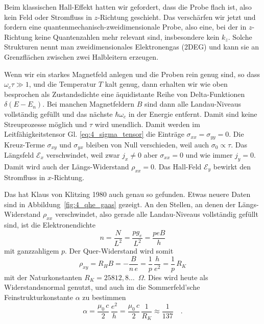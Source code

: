 Beim klassischen Hall-Effekt hatten wir gefordert, dass die  Probe flach  ist, also kein Feld oder Stromfluss in $z$-Richtung geschieht. Das verschärfen wir jetzt und fordern eine quantenmechanisch-zweidimensionale Probe, also eine, bei der in $z$-Richtung keine Quantenzahlen mehr relevant sind, insbesondere kein $k_z$. Solche Strukturen nennt man zweidimensionales Elektronengas (2DEG) und kann sie an Grenzflächen zwischen zwei Halbleitern erzeugen.

Wenn wir ein starkes Magnetfeld anlegen und die Proben rein genug sind, so dass $\omega_c \tau \gg 1$, und die Temperatur $T$ kalt genug, dann erhalten wir wie oben besprochen als Zustandsdichte eine äquidistante Reihe von Delta-Funktionen $\delta(E-E_n)$.  Bei manchen Magnetfeldern $B$ sind dann alle Landau-Niveaus vollständig gefüllt und das nächste $\hbar \omega_c$ in der Energie 
  entfernt. Damit sind keine Streuprozesse möglich und $\tau$ wird unendlich. Damit werden im Leitfähigkeitstensor  
  Gl. \ref{eq:4_sigma_tensor} die Einträge $\sigma_{xx} = \sigma_{yy} = 0$. 
  Die Kreuz-Terme $\sigma_{xy}$ und $\sigma_{yx}$ bleiben von Null  verschieden, weil auch $\sigma_0 \propto \tau$. 
Das Längsfeld $\mathcal{E}_x$ verschwindet, weil zwar $j_x \neq 0$ aber  $\sigma_{xx} = 0$ und wie immer  $j_y = 0$. Damit wird auch der Längs-Widerstand $\rho_{xx} = 0$.
Das Hall-Feld $\mathcal{E}_y$ bewirkt den Stromfluss in $x$-Richtung.

Das hat Klaus von Klitzing 1980 auch genau  so gefunden. Etwas neuere Daten sind in Abbildung~\ref{fig:4_qhe_gaas} gezeigt. An den Stellen, an denen der Längs-Widerstand $\rho_{xx}$ verschwindet, also gerade alle Landau-Niveaus vollständig gefüllt sind, ist die Elektronendichte
\begin{equation}
   n = \frac{N}{L^2} = \frac{p g_e}{L^2} = \frac{p e B}{h}
\end{equation}
mit ganzzahligem $p$. Der Quer-Widerstand wird somit
\begin{equation}
  \rho_{xy} = R_H B =  - \frac{B}{n \, e} = \frac{1}{p} \, \frac{h}{e^2} = \frac{1}{p} \, R_K
\end{equation} 
mit der Naturkonstanten $R_K = 25812,8\dots$~$\Omega$. Dies wird heute als Widerstandsnormal genutzt, und auch im die Sommerfeld'sche Feinstrukturkonstante $\alpha$ zu bestimmen
\begin{equation}
   \alpha = \frac{\mu_0 \, c}{2} \, \frac{e^2}{h} = \frac{\mu_0 \, c}{2} \, \frac{1}{R_K} \approx \frac{1}{137} \quad .
\end{equation}



